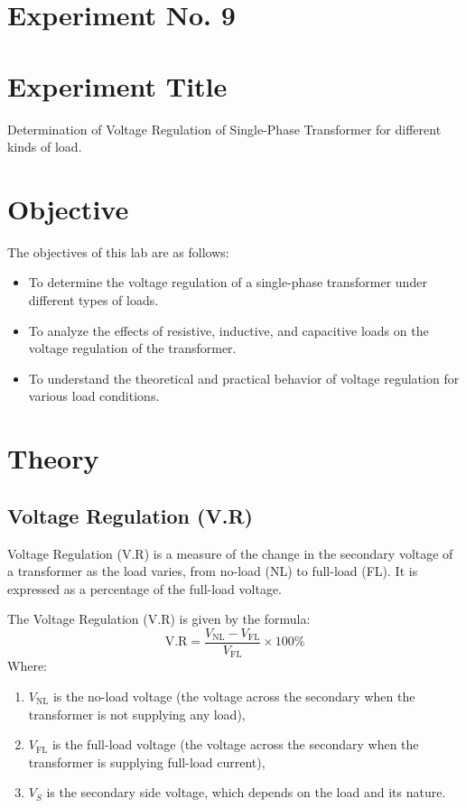 \documentclass[a4paper,12pt]{article}
\begin{document}
	\section{Experiment No. 9}
	
	\section{Experiment Title }
	Determination of Voltage Regulation of Single-Phase Transformer for different kinds of load.
	\section{Objective}
	
	The objectives of this lab are as follows:
	\begin{itemize}
		 \item To determine the voltage regulation of a single-phase transformer under different types of loads.
		\item To analyze the effects of resistive, inductive, and capacitive loads on the voltage regulation of the transformer.
		\item To understand the theoretical and practical behavior of voltage regulation for various load conditions.
	\end{itemize}
	
	\section{Theory}

\subsection{Voltage Regulation (V.R)}

Voltage Regulation (V.R) is a measure of the change in the secondary voltage of a transformer as the load varies, from no-load (NL) to full-load (FL). It is expressed as a percentage of the full-load voltage.  

The Voltage Regulation (V.R) is given by the formula:
\[
\text{V.R} = \frac{V_{\text{NL}} - V_{\text{FL}}}{V_{\text{FL}}} \times 100 \%
\]
Where:
\begin{enumerate}
	\item $V_{\text{NL}}$ is the no-load voltage (the voltage across the secondary when the transformer is not supplying any load),
	\item $V_{\text{FL}}$ is the full-load voltage (the voltage across the secondary when the transformer is supplying full-load current),
	\item $V_S$ is the secondary side voltage, which depends on the load and its nature.
\end{enumerate}
\end{document}

